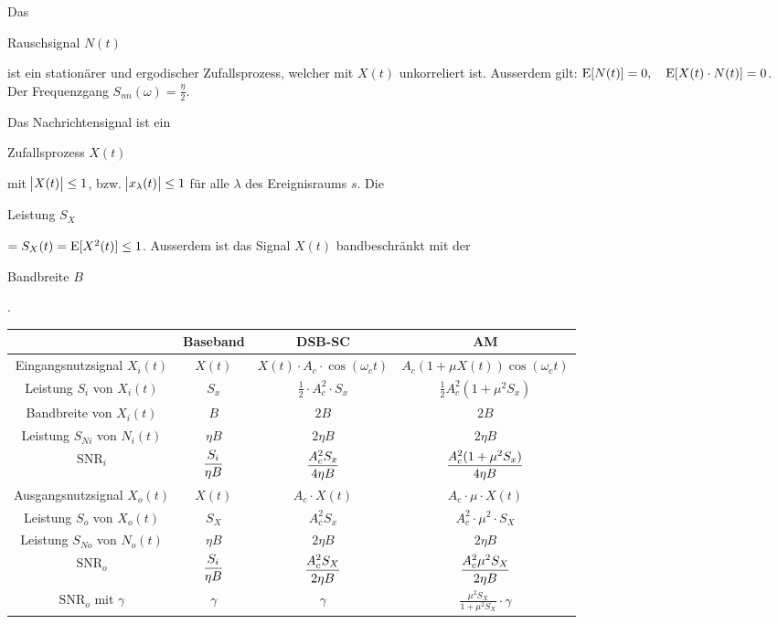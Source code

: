 \documentclass[a4paper]{article}
\begin{document}
\begin{twocolumn}
Das \begin{definition}Rauschsignal $N(t)$\end{definition} ist ein stationärer und ergodischer
Zufallsprozess, welcher mit $X(t)$ unkorreliert ist. Ausserdem gilt: $\operatorname{E}[N(t)] = 0, \quad \operatorname{E}[X(t) \cdot N(t)] = 0$. 
Der Frequenzgang $S_{nn}(\omega) = \frac{\eta}{2}$.

Das Nachrichtensignal ist ein \begin{definition}Zufallsprozess $X(t)$\end{definition} mit 
$\abs{X(t)} \leq 1$, bzw. $\abs{x_\lambda(t)} \leq 1$ für alle $\lambda$ des Ereignisraums 
$s$. Die \begin{definition}Leistung $S_X$\end{definition} $= S_X(t) = \operatorname{E}[X^2(t)] \leq 1$. 
Ausserdem ist das Signal $X(t)$ bandbeschränkt mit der 
\begin{definition}Bandbreite $B$\end{definition}.


\begin{footnotesize}
\begin{tabular}{|c|c|c|c|}
  \hline
   & \textbf{Baseband} & \textbf{DSB-SC} & \textbf{AM} \\ \hline
  Eingangsnutzsignal $X_i(t)$ & 
  $X(t)$ & $X(t) \cdot A_c \cdot \cos(\omega_c t)$ & $A_c (1 + \mu X(t)) \cos(\omega_c t)$ \\\hline
  Leistung $S_i$ von $X_i(t)$ & $S_x$ & $\frac{1}{2} \cdot A_c^2 \cdot S_x$ & 
  $\frac{1}{2}A_c^2 (1 + \mu^2 S_x)$ \\ \hline
  Bandbreite von $X_i(t)$ & $B$ & $2B$ & $2B$ \\ \hline
  Leistung $S_{Ni}$ von $N_i(t)$ & $\eta B$ & $2 \eta B$ & $2 \eta B$ \\ \hline
  $\text{SNR}_i$ & $\displaystyle \frac{S_i}{\eta B}$ & $\displaystyle \frac{A_c^2 S_x}{4 \eta B}$ & 
  $\displaystyle \frac{A_c^2 (1 + \mu^2 S_x)}{4 \eta B}$ \\ \hline
  Ausgangsnutzsignal $X_o(t)$ & $X(t)$ & $A_c \cdot X(t)$ & $A_c \cdot \mu \cdot X(t)$ \\ \hline
  Leistung $S_o$ von $X_o(t)$ & $S_X$ & $A_c^2 S_x$ & $A_c^2 \cdot \mu^2 \cdot S_X$ \\ \hline
  Leistung $S_{No}$ von $N_o(t)$ & $\eta B$ & $2 \eta B$ & $2 \eta B$ \\ \hline
  $\text{SNR}_o$ & $\displaystyle \frac{S_i}{\eta B}$ & $\displaystyle \frac{A_c^2 S_X}{2 \eta B}$ & 
  $\displaystyle \frac{A_c^2 \mu^2 S_X}{2 \eta B}$ \\ \hline
  $\text{SNR}_o$ mit $\gamma$ & $\gamma$ & $\gamma$ & $\frac{\mu^2 S_X}{1 + \mu^2 S_X} 
  \cdot \gamma$ \\ \hline 
\end{tabular} 


\end{footnotesize}
\end{twocolumn}
\end{document}
